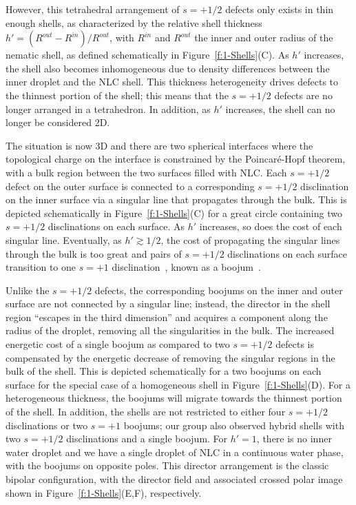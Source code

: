 However, this tetrahedral arrangement of $s = +1/2$ defects only exists in thin enough shells, as characterized by the relative shell thickness $h' = (R^{out}-R^{in})/R^{out}$, with $R^{in}$ and $R^{out}$ the inner and outer radius of the nematic shell, as defined schematically in Figure~\ref{f:1-Shells}(C).
As $h'$ increases, the shell also becomes inhomogeneous due to density differences between the inner droplet and the NLC shell.
This thickness heterogeneity drives defects to the thinnest portion of the shell; this means that the $s = +1/2$ defects are no longer arranged in a tetrahedron.
In addition, as $h'$ increases, the shell can no longer be considered 2D.

The situation is now 3D and there are two spherical interfaces where the topological charge on the interface is constrained by the Poincar\'e-Hopf theorem, with a bulk region between the two surfaces filled with NLC.
Each $s = +1/2$ defect on the outer surface is connected to a corresponding $s = +1/2$ disclination on the inner surface via a singular line that propagates through the bulk.
This is depicted schematically in Figure~\ref{f:1-Shells}(C) for a great circle containing two $s = +1/2$ disclinations on each surface.
As $h'$ increases, so does the cost of each singular line.
Eventually, as $h'\gtrsim 1/2$, the cost of propagating the singular lines through the bulk is too great and pairs of $s = +1/2$ disclinations on each surface transition to one $s = +1$ disclination~\cite{RN105}, known as a boojum~\cite{RN273}.

Unlike the $s = +1/2$ defects, the corresponding boojums on the inner and outer surface are not connected by a singular line; instead, the director in the shell region ``escapes in the third dimension'' and acquires a component along the radius of the droplet, removing all the singularities in the bulk.
The increased energetic cost of a single boojum as compared to two $s = +1/2$ defects is compensated by the energetic decrease of removing the singular regions in the bulk of the shell.
This is depicted schematically for a two boojums on each surface for the special case of a homogeneous shell in Figure~\ref{f:1-Shells}(D).
For a heterogeneous thickness, the boojums will migrate towards the thinnest portion of the shell.
In addition, the shells are not restricted to either four $s = +1/2$ disclinations or two $s = +1$ boojums; our group also observed hybrid shells with two $s = +1/2$ disclinations and a single boojum.
For $h' = 1$, there is no inner water droplet and we have a single droplet of NLC in a continuous water phase, with the boojums on opposite poles.
This director arrangement is the classic bipolar configuration, with the director field and associated crossed polar image shown in Figure~\ref{f:1-Shells}(E,F), respectively.


